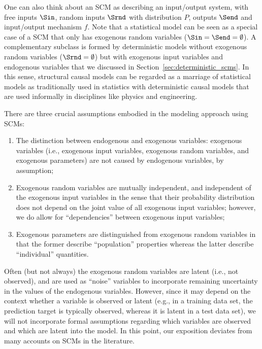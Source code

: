 One can also think about an SCM as describing an input/output system, with free inputs
$\Sin$, random inputs $\Srnd$ with distribution $P$, outputs $\Send$ and input/output mechanism $f$.
Note that a statistical model can
be seen as a special case of a SCM that only has exogenous random variables
($\Sin = \Send = \emptyset$).
A complementary subclass is formed by deterministic models without exogenous random variables
($\Srnd = \emptyset$) but with exogenous input variables and endogenous variables 
that we discussed in Section~\ref{sec:deterministic_scms}. In this sense, structural 
causal models can be regarded as a marriage of statistical models as traditionally used 
in statistics with deterministic causal models that are used informally in disciplines
like physics and engineering.

\begin{Rem}
There are three crucial assumptions embodied in the modeling approach using SCMs:
\begin{enumerate}
  \item The distinction between endogenous and exogenous variables: exogenous variables
    (i.e., exogenous input variables, exogenous random variables, and exogenous parameters)
    are not caused by endogenous variables, by assumption;
  \item Exogenous random variables are mutually independent, and independent of the
    exogenous input variables in the sense that their probability distribution does
    not depend on the joint value of all exogenous input variables; however, we do
    allow for ``dependencies'' between exogenous input variables;
  \item Exogenous parameters are distinguished from exogenous random variables in that
    the former describe ``population'' properties whereas the latter describe ``individual''
    quantities.
\end{enumerate}
Often (but not always) the exogenous random variables are latent (i.e., not observed),
and are used as ``noise'' variables to incorporate remaining uncertainty in the values of the endogenous variables.
However, since it may depend on the context whether a variable is observed or latent 
(e.g., in a training data set, the prediction target is typically observed, whereas
it is latent in a test data set), we will not incorporate formal assumptions regarding
which variables are observed and which are latent into the model. In this point, our
exposition deviates from many accounts on SCMs in the literature.

\end{Rem}

